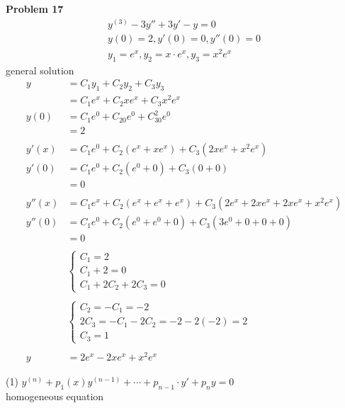 \documentclass[10pt, letterpaper]{article}
\begin{document}
\textbf{Problem 17}\\
\begin{align*}
y^{(3)} -3y'' +3y' -y =0\\
y(0) =2, y'(0)=0, y''(0)=0\\
y_1 =e^x, y_2 =x\cdot e^x, y_3 =x^2e^x
\end{align*}
general solution
\begin{align*}
y &= C_1y_1 +C_2y_2 +C_3y_3\\
&= C_1e^x +C_2xe^x +C_3x^2e^x\\
y(0) &= C_1e^0 +C_20e^0 +C_30^2e^0\\
&=2\\
\\
y'(x) &= C_1e^0 +C_2(e^x +xe^x) +C_3(2xe^x +x^2e^x)\\
y'(0) &= C_1e^0 +C_2(e^0 +0) +C_3(0+0)\\
&= 0\\
\\
y''(x) &= C_1e^x +C_2(e^x +e^x +e^x) +C_3(2e^x +2xe^x +2xe^x +x^2e^x)\\
y''(0) &= C_1e^0 +C_2(e^0 +e^0 +0) +C_3(3e^0 +0 +0 +0)\\
&=0\\
\\
&\begin{cases}
C_1 =2\\
C_1 +2 =0\\
C_1 +2C_2 +2C_3 =0
\end{cases}\\
\\
&\begin{cases}
C_2 =-C_1 =-2\\
2C_3 =-C_1 -2C_2 =-2-2(-2) =2\\
C_3 =1
\end{cases}\\
\\
y &= 2e^x -2xe^x +x^2e^x
\end{align*}

(1) $y^{(n)} +p_1(x)y^{(n-1)} +\cdots +p_{n-1}\cdot y' +p_ny =0$\\
homogeneous equation\\
\\
\end{document}
